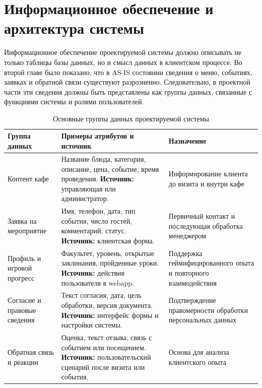 \section{Информационное обеспечение и архитектура системы}

Информационное обеспечение проектируемой системы должно описывать не только таблицы базы данных, но и смысл данных в клиентском процессе. Во второй главе было показано, что в AS-IS состоянии сведения о меню, событиях, заявках и обратной связи существуют разрозненно. Следовательно, в проектной части эти сведения должны быть представлены как группы данных, связанные с функциями системы и ролями пользователей.

\begin{table}[H]
\centering
\small
\caption{Основные группы данных проектируемой системы}
\label{tab:ch3_data_groups}
\begin{tabularx}{\textwidth}{|>{\raggedright\arraybackslash}p{}|>{\raggedright\arraybackslash}p{}|>{\raggedright\arraybackslash}X|}
\hline
\textbf{Группа данных} & \textbf{Примеры атрибутов и источник} & \textbf{Назначение} \\ \hline
Контент кафе & Название блюда, категория, описание, цена, событие, время проведения. \newline \textbf{Источник:} управляющая или администратор. & Информирование клиента до визита и внутри кафе \\ \hline
Заявка на мероприятие & Имя, телефон, дата, тип события, число гостей, комментарий, статус. \newline \textbf{Источник:} клиентская форма. & Первичный контакт и последующая обработка менеджером \\ \hline
Профиль и игровой прогресс & Факультет, уровень, открытые заклинания, пройденные уроки. \newline \textbf{Источник:} действия пользователя в webapp. & Поддержка геймифицированного опыта и повторного взаимодействия \\ \hline
Согласие и правовые сведения & Текст согласия, дата, цель обработки, версия документа. \newline \textbf{Источник:} интерфейс формы и настройки системы. & Подтверждение правомерности обработки персональных данных \\ \hline
Обратная связь и реакции & Оценка, текст отзыва, связь с событием или посещением. \newline \textbf{Источник:} пользовательский сценарий после визита или события. & Основа для анализа клиентского опыта \\ \hline
\end{tabularx}
\normalsize
\end{table}

